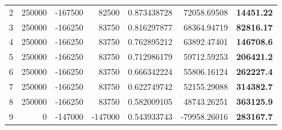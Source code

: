 \documentclass[12pt]{article}
\begin{document}
\begin{landscape}
\begin{table}[htbp]
\begin{tabular}{rrrrrrr}
    2     & 250000 & -167500 & 82500 & 0.873438728 & 72058.69508 & \textbf{14451.22} \\
    3     & 250000 & -166250 & 83750 & 0.816297877 & 68364.94719 & \textbf{82816.17} \\
    4     & 250000 & -166250 & 83750 & 0.762895212 & 63892.47401 & \textbf{146708.6} \\
    5     & 250000 & -166250 & 83750 & 0.712986179 & 59712.59253 & \textbf{206421.2} \\
    6     & 250000 & -166250 & 83750 & 0.666342224 & 55806.16124 & \textbf{262227.4} \\
    7     & 250000 & -166250 & 83750 & 0.622749742 & 52155.29088 & \textbf{314382.7} \\
    8     & 250000 & -166250 & 83750 & 0.582009105 & 48743.26251 & \textbf{363125.9} \\
    \midrule
    9     & 0     & -147000 & -147000 & 0.543933743 & -79958.26016 & \textbf{283167.7} \\
    
    \bottomrule
    \end{tabular}%
  \label{profit2}%
\end{table}%
\end{landscape}
\end{document}
